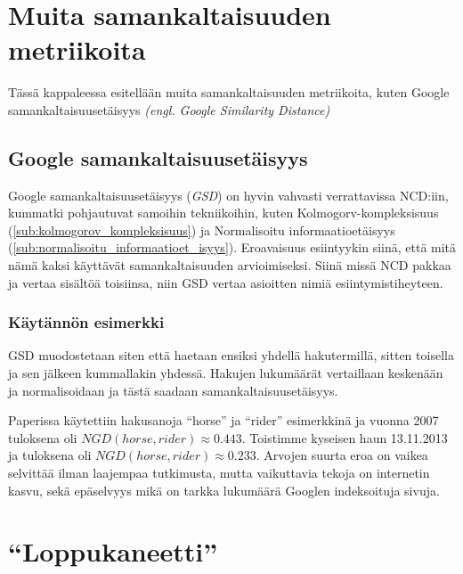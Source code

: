 \documentclass[12pt,finnish,draft]{tktltiki2}
\theoremstyle{definition}
\theoremstyle{remark}
\newcommand{\engl}[1]{\emph{(engl. #1)}}
\begin{document}
\section{Muita samankaltaisuuden metriikoita} %
\label{sec:muita_samankaltaisuuden_metriikoita}
  Tässä kappaleessa esitellään muita samankaltaisuuden metriikoita, kuten Google samankaltaisuusetäisyys \engl{Google Similarity Distance}
  \subsection{Google samankaltaisuusetäisyys} %
  \label{sub:google_similarity_distance}
    Google samankaltaisuusetäisyys (\emph{GSD}) on hyvin vahvasti verrattavissa NCD:iin, kummatki pohjautuvat samoihin tekniikoihin, kuten Kolmogorv-kompleksisuus (\ref{sub:kolmogorov_kompleksisuus}) ja Normalisoitu informaatioetäisyys (\ref{sub:normalisoitu_informaatioet_isyys}).
    Eroavaisuus esiintyykin siinä, että mitä nämä kaksi käyttävät samankaltaisuuden arvioimiseksi.
    Siinä missä NCD pakkaa ja vertaa sisältöä toisiinsa, niin GSD vertaa asioitten nimiä esiintymistiheyteen.

    \subsubsection{Käytännön esimerkki} %
    \label{ssub:k_yt_nn_n_esimerkki}
      GSD muodostetaan siten että haetaan ensiksi yhdellä hakutermillä, sitten toisella ja sen jälkeen kummallakin yhdessä.
      Hakujen lukumäärät vertaillaan keskenään ja normalisoidaan ja tästä saadaan samankaltaisuusetäisyys.

      Paperissa \cite{cilibrasi2007google} käytettiin hakusanoja ``horse'' ja ``rider'' esimerkkinä ja vuonna 2007 tuloksena oli $NGD(horse, rider) \approx 0.443$.
      Toistimme kyseisen haun 13.11.2013 ja tuloksena oli $NGD(horse, rider) \approx 0.233$.
      Arvojen suurta eroa on vaikea selvittää ilman laajempaa tutkimusta, mutta vaikuttavia tekoja on internetin kasvu, sekä epäselvyys mikä on tarkka lukumäärä Googlen indeksoituja sivuja.





\section{``Loppukaneetti''} %
\label{sec:loppukaneetti}
\end{document}
